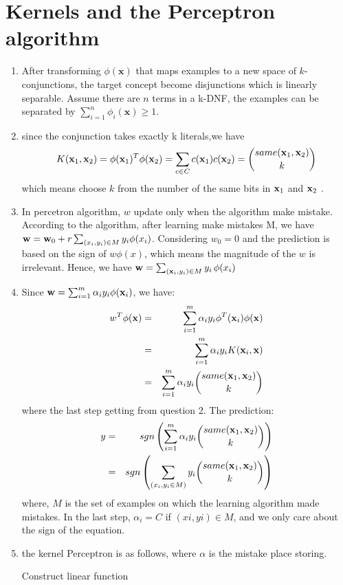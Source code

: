 \documentclass[12pt, fullpage,letterpaper]{article}
\newcommand{\bx}{{\bf x}}
\newcommand{\bw}{{\bf w}}
\begin{document}
\section{Kernels and the Perceptron algorithm}
\begin{enumerate}
\item  After transforming $\phi(\textbf{x})$ that maps examples  to a new space of $k$-conjunctions, the target concept become disjunctions which is linearly separable. Assume there are $n$ terms in a k-DNF, the examples can be separated by $\sum_{i=1}^n \phi_i(\textbf{x}) \ge 1$. 

\item since the conjunction takes exactly k literals,we have
\begin{equation*}
K(\bx_1, \bx_2) = \phi(\bx_1)^T\phi(\bx_2) = \sum_{c \in C} c(\bx_1)c(\bx_2)=\binom{same(\bx_1, \bx_2 )}{k}
\end{equation*}
which  means choose $k$ from the number of the same bits in $\bx_1$ and $\bx_2$ .
\item In percetron algorithm, $w$ update only when the algorithm make mistake. According to the algorithm, after learning make mistakes M, we have $\bw=\bw_0+r\sum_{(x_i, y_i)\in M} y_i \phi(x_i)$. Considering $w_0=0$ and the prediction is based on the sign of $w\phi(x)$, which means the 	magnitude of the $w$ is irrelevant. Hence, we have  $\bw = \sum_{(\bx_i, y_i) \in M} y_i \, \phi(x_i) $

\item Since $\bw=\sum_{i=1}^m \alpha_i y_i \phi(\bx_i)$, we have:
\begin{eqnarray*}
w^T \phi(\bx)&=&\sum_{i=1}^m \alpha_i y_i \phi^T(\bx_i)\phi(\bx) \\
&=&\sum_{i=1}^m \alpha_i y_i K(\bx_i,\bx) \\
&=&\sum_{i=1}^m \alpha_i y_i \binom{same(\bx_1, \bx_2 )}{k}
\end{eqnarray*}
where the last step getting from question 2. The prediction:
\begin{eqnarray*}
y&=&sgn\left(\sum_{i=1}^m \alpha_i y_i \binom{same(\bx_1, \bx_2 )}{k}\right)\\
&=&sgn\left( \sum_{(x_i, y_i \in M)} y_i \binom{same(\bx_1, \bx_2 )}{k}\right)
\end{eqnarray*}
where, $M $ is the set of examples on which the learning algorithm made mistakes. In the last step, $\alpha_i=C$ if $(xi,yi) \in M$, and we only care about the sign of the equation.

\item the kernel Perceptron is as follows, where $\alpha$ is the mistake place storing.

\begin{algorithm*} 
\caption{Construct linear function}
\begin{algorithmic} 
\IF{$y_i\sum_{j=1}^{i-1}\alpha_j y_j K(\bx_j,\bx_i) \le 0$}
\ENDIF
\ENDFOR
\RETURN{$\alpha$}
\end{algorithmic}
\end{algorithm*}
\end{enumerate}
\end{document}
